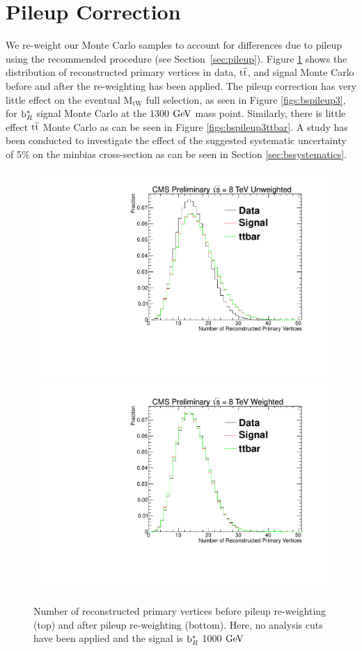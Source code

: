 \section{Pileup Correction}
\label{sec:bspileup}
We re-weight our Monte Carlo samples to account for differences due to pileup using the recommended procedure (see Section~\ref{sec:pileup}).  
Figure \ref{figs:bsnpvweight} shows the distribution of reconstructed primary vertices in data, $\mathrm{t\overline{t}}$,
and signal Monte Carlo before and after the re-weighting has been applied. The pileup correction has very little effect on the eventual $\mathrm{M_{tW}}$ 
full selection, as 
seen in Figure \ref{figs:bspileup3}, for $\mathrm{b}^{*}_R$ signal Monte Carlo at the 1300$~\mathrm{GeV}$ mass point. Similarly, there is little effect 
$\mathrm{t\overline{t}}$ Monte Carlo as can be seen in Figure \ref{figs:bspileup3ttbar}.  
A study has been conducted to investigate the effect of the suggested systematic uncertainty of 5\% on the minbias cross-section as can be seen in Section \ref{sec:bssystematics}.  


\begin{figure}
\begin{center}
\includegraphics[width=0.7\linewidth]{AN-14-049/figs/npvuw.pdf}\\
\includegraphics[width=0.7\linewidth]{AN-14-049/figs/npvw.pdf}
\end{center}
\caption{Number of reconstructed primary vertices before pileup re-weighting (top) and after pileup re-weighting (bottom).  Here, no analysis cuts have been applied and the signal is $\mathrm{b}^{*}_R$ 1000$~\mathrm{GeV}$}
\label{figs:bsnpvweight}
\end{figure}

